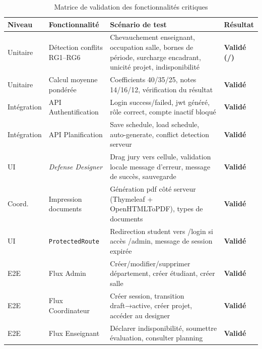 \begin{table}[H]
    \centering
    \small
    \begin{xltabular}{\textwidth}{llXX}
        \toprule

        \textbf{Niveau} & \textbf{Fonctionnalité} & \textbf{Scénario de test} & \textbf{Résultat} \\
        \midrule
        Unitaire & Détection conflits RG1--RG6 & Chevauchement enseignant, occupation salle, bornes de période, surcharge encadrant, unicité projet, indisponibilité & \textbf{Validé (/)} \\
        \addlinespace
        Unitaire & Calcul moyenne pondérée & Coefficients 40/35/25, notes 14/16/12, vérification du résultat & \textbf{Validé} \\
        \addlinespace
        Intégration & API Authentification & Login success/failed, \acrshort{jwt} généré, rôle correct, compte inactif bloqué & \textbf{Validé} \\
        \addlinespace
        Intégration & API Planification & Save schedule, load schedule, auto-generate, conflict detection serveur & \textbf{Validé} \\
        \addlinespace
        UI & \textit{Defense Designer} & Drag jury vers cellule, validation locale message d'erreur, message de succès, sauvegarde & \textbf{Validé} \\
        \addlinespace
        Coord. & Impression documents & Génération \acrshort{pdf} côté serveur (Thymeleaf + OpenHTMLToPDF),  types de documents & \textbf{Validé} \\
        \addlinespace
        UI & \texttt{ProtectedRoute} & Redirection student vers /login si accès /admin, message de session expirée & \textbf{Validé} \\
        \addlinespace
        E2E & Flux Admin & Créer/modifier/supprimer département, créer étudiant, créer salle & \textbf{Validé} \\
        \addlinespace
        E2E & Flux Coordinateur & Créer session, transition draft→active, créer projet, accéder au designer & \textbf{Validé} \\
        \addlinespace
        E2E & Flux Enseignant & Déclarer indisponibilité, soumettre évaluation, consulter planning & \textbf{Validé} \\
        \bottomrule
    \end{xltabular}
    \caption{Matrice de validation des fonctionnalités critiques}
    \label{tab:validation_results}
\end{table}

